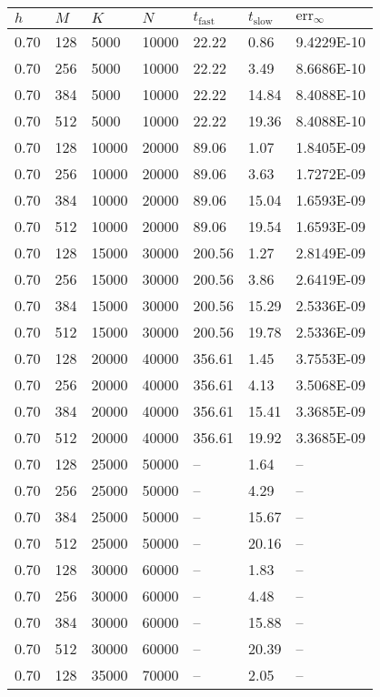 \begin{tabular}{l|l|l|l|l|l|l}
$h$ & $M$ & $K$ & $N$ & $t_{\text{fast}}$ & $t_{\text{slow}}$ & $\text{err}_{\infty}$\\\hline
0.70 & 128 &   5000 &  10000 & 22.22 &  0.86 & 9.4229E-10\\
0.70 & 256 &   5000 &  10000 & 22.22 &  3.49 & 8.6686E-10\\
0.70 & 384 &   5000 &  10000 & 22.22 & 14.84 & 8.4088E-10\\
0.70 & 512 &   5000 &  10000 & 22.22 & 19.36 & 8.4088E-10\\
0.70 & 128 &  10000 &  20000 & 89.06 &  1.07 & 1.8405E-09\\
0.70 & 256 &  10000 &  20000 & 89.06 &  3.63 & 1.7272E-09\\
0.70 & 384 &  10000 &  20000 & 89.06 & 15.04 & 1.6593E-09\\
0.70 & 512 &  10000 &  20000 & 89.06 & 19.54 & 1.6593E-09\\
0.70 & 128 &  15000 &  30000 & 200.56 &  1.27 & 2.8149E-09\\
0.70 & 256 &  15000 &  30000 & 200.56 &  3.86 & 2.6419E-09\\
0.70 & 384 &  15000 &  30000 & 200.56 & 15.29 & 2.5336E-09\\
0.70 & 512 &  15000 &  30000 & 200.56 & 19.78 & 2.5336E-09\\
0.70 & 128 &  20000 &  40000 & 356.61 &  1.45 & 3.7553E-09\\
0.70 & 256 &  20000 &  40000 & 356.61 &  4.13 & 3.5068E-09\\
0.70 & 384 &  20000 &  40000 & 356.61 & 15.41 & 3.3685E-09\\
0.70 & 512 &  20000 &  40000 & 356.61 & 19.92 & 3.3685E-09\\
0.70 & 128 &  25000 &  50000 & -- &  1.64 & --\\
0.70 & 256 &  25000 &  50000 & -- &  4.29 & --\\
0.70 & 384 &  25000 &  50000 & -- & 15.67 & --\\
0.70 & 512 &  25000 &  50000 & -- & 20.16 & --\\
0.70 & 128 &  30000 &  60000 & -- &  1.83 & --\\
0.70 & 256 &  30000 &  60000 & -- &  4.48 & --\\
0.70 & 384 &  30000 &  60000 & -- & 15.88 & --\\
0.70 & 512 &  30000 &  60000 & -- & 20.39 & --\\
0.70 & 128 &  35000 &  70000 & -- &  2.05 & --\\

\end{tabular}
